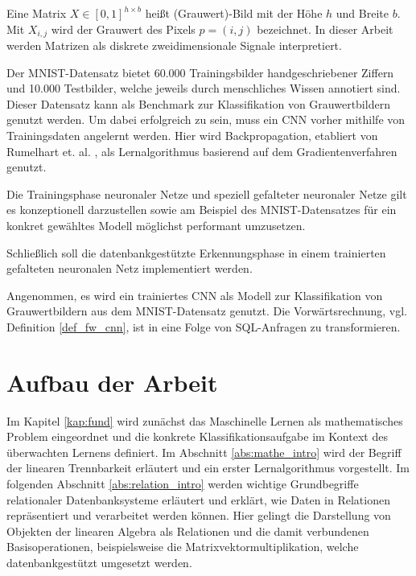 \begin{defi}
    \label{def:image}
    Eine Matrix $X \in [0,1]^{h \times b}$ heißt (Grauwert)-Bild mit der Höhe $h$ und Breite $b$. Mit $X_{i,j}$ wird der Grauwert des Pixels $p=(i,j)$ bezeichnet. In dieser Arbeit werden Matrizen als diskrete zweidimensionale Signale interpretiert.
\end{defi}
Der MNIST-Datensatz bietet 60.000 Trainingsbilder handgeschriebener Ziffern und 10.000 Testbilder, welche jeweils durch menschliches
Wissen annotiert sind. Dieser Datensatz kann als Benchmark zur Klassifikation von Grauwertbildern genutzt werden. Um dabei erfolgreich zu sein, muss ein CNN vorher mithilfe von Trainingsdaten angelernt werden. Hier wird Backpropagation, etabliert von Rumelhart et. al. \cite{MLPbook}, als Lernalgorithmus basierend auf dem Gradientenverfahren 
genutzt.
\begin{problem}
    \label{prop:train}
    Die Trainingsphase neuronaler Netze und speziell gefalteter neuronaler Netze gilt es konzeptionell darzustellen sowie am Beispiel des MNIST-Datensatzes für ein konkret gewähltes Modell möglichst performant umzusetzen. 
\end{problem}

Schließlich soll die datenbankgestützte Erkennungsphase in einem trainierten gefalteten neuronalen Netz implementiert werden.

\begin{problem}
    \label{prob:ffCCN}
    Angenommen, es wird ein trainiertes CNN als Modell zur Klassifikation von Grauwertbildern aus dem MNIST-Datensatz genutzt. Die Vorwärtsrechnung, vgl. Definition \ref{def_fw_cnn}, ist in eine Folge von SQL-Anfragen zu transformieren.
\end{problem}

\section*{Aufbau der Arbeit}
\label{abs:glied}
Im Kapitel \ref{kap:fund} wird zunächst das Maschinelle Lernen als mathematisches Problem eingeordnet und die konkrete Klassifikationsaufgabe im Kontext des überwachten Lernens definiert. Im Abschnitt \ref{abs:mathe_intro} wird der Begriff der linearen Trennbarkeit erläutert und ein erster Lernalgorithmus vorgestellt. Im folgenden Abschnitt \ref{abs:relation_intro} werden wichtige Grundbegriffe relationaler Datenbanksysteme erläutert und erklärt, wie Daten in Relationen repräsentiert und verarbeitet werden können. Hier gelingt die Darstellung von Objekten der linearen Algebra als Relationen und die damit verbundenen Basisoperationen, beispielsweise die Matrixvektormultiplikation, welche datenbankgestützt umgesetzt werden.

